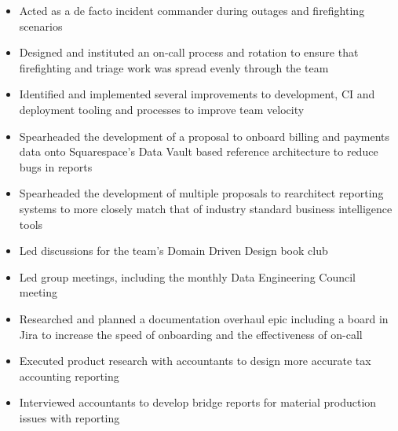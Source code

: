 \begin{itemize}
  \item Acted as a de facto incident commander during outages and firefighting scenarios
  \item Designed and instituted an on-call process and rotation to ensure that
    firefighting and triage work was spread evenly through the team
  \item Identified and implemented several improvements to development, CI and
    deployment tooling and processes to improve team velocity
  \item Spearheaded the development of a proposal to onboard billing and
    payments data onto Squarespace's Data Vault based reference architecture to
    reduce bugs in reports
  \item Spearheaded the development of multiple proposals to rearchitect
    reporting systems to more closely match that of industry standard business
    intelligence tools
  \item Led discussions for the team's Domain Driven Design book club
  \item Led group meetings, including the monthly Data Engineering Council
    meeting
  \item Researched and planned a documentation overhaul epic including a board
    in Jira to increase the speed of onboarding and the effectiveness of on-call
  \item Executed product research with accountants to design more accurate tax
    accounting reporting
  \item Interviewed accountants to develop bridge reports for material
    production issues with reporting
\end{itemize}
